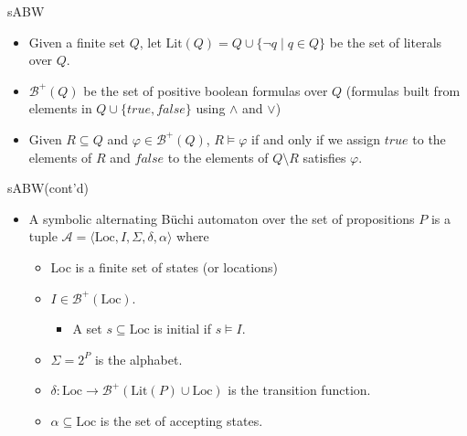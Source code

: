 \documentclass[12pt]{beamer}
\begin{document}
\begin{frame}{sABW}
	\begin{itemize}
		\item Given a finite set $Q$, let $\text{Lit}(Q) = Q \cup \{\neg q \mid q \in Q\}$ be the set of literals over $Q$.
		\item $\mathcal{B}^{+}(Q)$ be the set of positive boolean formulas over $Q$ (formulas built from elements in $Q\cup\{true, false\}$ using $\land$ and $\lor$)
		\item Given $R \subseteq Q$ and $\varphi \in \mathcal{B}^{+}(Q)$, $R \models \varphi$ if and only if we assign $true$ to the
elements of $R$ and $false$ to the elements of $Q \setminus R$ satisfies $\varphi$.
	\end{itemize}
\end{frame}

\begin{frame}{sABW(cont'd)}
	\begin{itemize}
		\item A symbolic alternating Büchi automaton over the set of propositions $P$ is a tuple $\mathcal{A} = \langle \text{Loc}, I, \Sigma, \delta, \alpha \rangle$ where
		\begin{itemize}
			\item Loc is a finite set of states (or locations)
			\item $I \in \mathcal{B}^{+}(\text{Loc})$.
				\begin{itemize}
					\item A set $s \subseteq \text{Loc}$ is initial if $s \models I$.
				\end{itemize}
			\item $\Sigma = 2^{P}$ is the alphabet.
			\item $\delta : \text{Loc} \to \mathcal{B}^{+}(\text{Lit}(P)\cup\text{Loc})$ is the transition function.
			\item $\alpha \subseteq \text{Loc}$ is the set of accepting states.
		\end{itemize}
	\end{itemize}
\end{frame}
\end{document}
